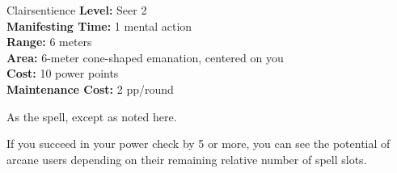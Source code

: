 {Clairsentience}
{
	\textbf{Level:}
	Seer 2\\
	\textbf{Manifesting Time:}
	1 mental action\\
	\textbf{Range:}
	6 meters\\
	\textbf{Area:}
	6-meter cone-shaped emanation, centered on you\\
	\textbf{Cost:}
	10 power points\\
	\textbf{Maintenance Cost:}
	2 pp/round\\
}
{
	As the  spell, except as noted here.

	If you succeed in your power check by 5 or more, you can see the potential of arcane users depending on their remaining relative number of spell slots.

}